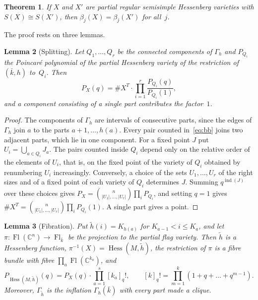\documentclass[11pt,a4paper]{article}
\numberwithin{equation}{section}
\theoremstyle{plain}
\newtheorem{theorem}{Theorem}[section]
\newtheorem{lemma}[theorem]{Lemma}
\theoremstyle{definition}
\theoremstyle{remark}
\newcommand{\C}{\mathbb{C}}
\DeclareMathOperator{\Fl}{Fl}
\DeclareMathOperator{\Hess}{Hess}
\DeclareMathOperator{\ind}{ind}
\begin{document}
\begin{theorem}\label{thm:q1-partial}
If $X$ and $X'$ are partial regular semisimple Hessenberg varieties with $S(X)\cong S(X')$, then $\beta_j(X)=\beta_j(X')$ for all~$j$.
\end{theorem}

The proof rests on three lemmas.

\begin{lemma}[Splitting]\label{lem:split}
Let $Q_1,\dots,Q_r$ be the connected components of $\Gamma_h$ and $P_{Q_i}$ the Poincaré polynomial of the partial Hessenberg variety of the restriction of $(\bar k,h)$ to~$Q_i$. Then
\[
P_X(q)=\#X^T\cdot\prod_{i=1}^r\frac{P_{Q_i}(q)}{P_{Q_i}(1)},
\]
and a component consisting of a single part contributes the factor~$1$.
\end{lemma}

\begin{proof}
The components of $\Gamma_h$ are intervals of consecutive parts, since the edges of $\Gamma_h$ join $a$ to the parts $a+1,\dots,h(a)$. Every pair counted in~\eqref{eq:bb} joins two adjacent parts, which lie in one component. For a fixed point $J$ put $U_i=\bigcup_{a\in Q_i}J_a$. The pairs counted inside $Q_i$ depend only on the relative order of the elements of $U_i$, that is, on the fixed point of the variety of $Q_i$ obtained by renumbering $U_i$ increasingly. Conversely, a choice of the sets $U_1,\dots,U_r$ of the right sizes and of a fixed point of each variety of $Q_i$ determines $J$. Summing $q^{\ind(J)}$ over these choices gives $P_X=\binom{n}{|U_1|,\dots,|U_r|}\prod_iP_{Q_i}$, and setting $q=1$ gives $\#X^T=\binom{n}{|U_1|,\dots,|U_r|}\prod_iP_{Q_i}(1)$. A single part gives a point.
\end{proof}

\begin{lemma}[Fibration]\label{lem:fibration}
Put $\tilde h(i)=K_{h(a)}$ for $K_{a-1}<i\leqslant K_a$, and let $\pi\colon\Fl(\C^n)\to\Fl_{\bar k}$ be the projection to the partial flag variety. Then $\tilde h$ is a Hessenberg function, $\pi^{-1}(X)=\Hess(M,\tilde h)$, the restriction of $\pi$ is a fibre bundle with fibre $\prod_a\Fl(\C^{k_a})$, and
\[
P_{\Hess(M,\tilde h)}(q)=P_X(q)\cdot\prod_{a=1}^s[k_a]_q!,\qquad[k]_q!=\prod_{m=1}^k(1+q+\dots+q^{m-1}).
\]
Moreover, $\Gamma_{\tilde h}$ is the inflation $\Gamma_h(\bar k)$ with every part made a clique.
\end{lemma}
\end{document}
